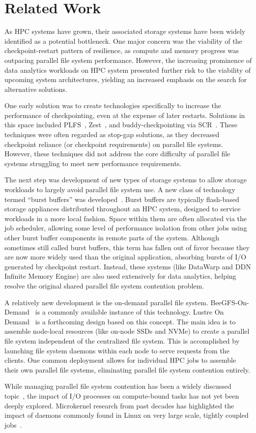 \section{Related Work}
As HPC systems have grown, their associated storage systems have been widely identified as a potential bottleneck. One major concern was the viability of the checkpoint-restart pattern of resilience, as compute and memory progress was outpacing parallel file system performance. However, the increasing prominence of data analytics workloads on HPC system presented further risk to the viability of upcoming system architectures, yielding an increased emphasis on the search for alternative solutions.

One early solution was to create technologies specifically to increase the performance of checkpointing, even at the expense of later restarts. Solutions in this space included PLFS~\cite{plfs}, Zest~\cite{zest}, and buddy-checkpointing via SCR~\cite{scr}. These techniques were often regarded as stop-gap solutions, as they decreased checkpoint reliance (or checkpoint requirements) on parallel file systems. However, these techniques did not address the core difficulty of parallel file systems struggling to meet new performance requirements.

The next step was development of new types of storage systems to allow storage workloads to largely avoid parallel file system use. A new class of technology termed ``burst buffers'' was developed~\cite{burstbuffers}. Burst buffers are typically flash-based storage appliances distributed throughout an HPC system, designed to service workloads in a more local fashion. Space within them are often allocated via the job scheduler, allowing some level of performance isolation from other jobs using other burst buffer components in remote parts of the system. Although sometimes still called burst buffers, this term has fallen out of favor because they are now more widely used than the original application, absorbing bursts of I/O generated by checkpoint restart. Instead, these systems (like DataWarp and DDN Infinite Memory Engine) are also used extensively for data analytics, helping resolve the original shared parallel file system contention problem.

A relatively new development is the on-demand parallel file system. BeeGFS-On-Demand~\cite{beeond} is a commonly available instance of this technology. Lustre On Demand~\cite{lustre-on-demand} is a forthcoming design based on this concept. The main idea is to assemble node-local resources (like on-node SSDs and NVMe) to create a parallel file system independent of the centralized file system. This is accomplished by launching file system daemons within each node to serve requests from the clients. One common deployment allows for individual HPC jobs to assemble their own parallel file systems, eliminating parallel file system contention entirely.

While managing parallel file system contention has been a widely discussed topic~\cite{managing-contention}, the impact of I/O processes on compute-bound tasks has not yet been deeply explored. Microkernel research from past decades has highlighted the impact of daemons commonly found in Linux on very large scale, tightly coupled jobs~\cite{daemon-interference}. 
